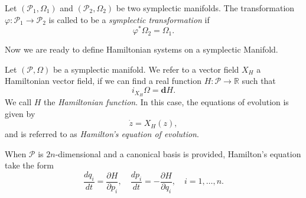 \begin{definition}
Let $(\mathcal P_1,\Omega_1)$ and $(\mathcal P_2,\Omega_2)$ be two symplectic manifolds. The transformation $\varphi:\mathcal P_1 \to \mathcal P_2$ is called to be a \emph{symplectic transformation} if
\begin{equation} \label{eq:2.16}
	\varphi^* \Omega_2 = \Omega_1.
\end{equation}
\end{definition}

Now we are ready to define Hamiltonian systems on a symplectic Manifold.

\begin{definition}
Let $(\mathcal P,\Omega)$ be a symplectic manifold. We refer to a vector field $X_H$ a Hamiltonian vector field, if we can find a real function $H:\mathcal P \to \mathbb R$ such that
\begin{equation} \label{eq:2.17}
	i_{X_H}\Omega = \mathbf d H.
\end{equation}
We call $H$ the \emph{Hamiltonian function}. In this case, the equations of evolution is given by
\begin{equation} \label{eq:2.18}
	\dot z = X_H(z),
\end{equation}
and is referred to as \emph{Hamilton's equation of evolution}.
\end{definition}
When $\mathcal P$ is $2n$-dimensional and a canonical basis is provided, Hamilton's equation take the form
\begin{equation} \label{eq:2.19}
	\frac{dq_i}{dt} = \frac{\partial H}{\partial p_i}, \quad \frac{dp_i}{dt} = - \frac{\partial H}{\partial q_i}, \quad i=1,\dots,n .
\end{equation}


